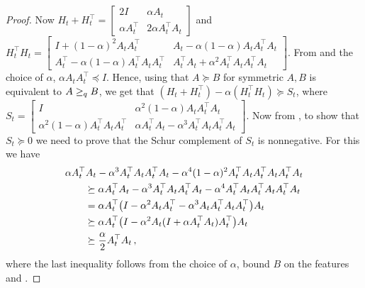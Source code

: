 \begin{proof}
Now 
$H_t+H_t^\top
	=\left[
		\begin{matrix} 2I & \alpha A_t\\ \alpha A_t^\top & 2\alpha A_t^\top A_t\end{matrix}\right]$ 
and $H_t^\top H_t=\left[\begin{matrix} I+(1-\alpha)^2A_tA_t^\top & A_t-\alpha(1-\alpha)A_tA_t^\top A_t\\ A_t^\top-\alpha(1-\alpha)A_t^\top A_t A_t^\top & A_t^\top A_t+\alpha^2A_t^\top A_t A_t^\top A_t\end{matrix}\right]$.  
From  and the choice of $\alpha$, $\alpha A_t A_t^\top \preceq I$. Hence, using that $A\succeq B$ for symmetric $A,B$ is equivalent to $A \geq_q B$, we get that
 $(H_t+H_t^\top) -\alpha(H_t^\top H_t) \succeq S_t$, 
 where $S_t=\left[\begin{matrix}I &\alpha^2(1-\alpha) A_tA_t^\top A_t\\ \alpha^2(1-\alpha) A_t^\top A_t A_t^\top &\alpha A_t^\top A_t-\alpha^3A_t^\top A_tA_t^\top A_t\end{matrix}\right]$. Now from , to show that $S_t\succeq 0$ we need to prove that the Schur complement of $S_t$ is nonnegative. For this we have
\begin{align*}
\MoveEqLeft 
\alpha A_t^\top A_t -\alpha^3A_t^\top A_t A_t^\top A_t - \alpha^4(1-\alpha)^2A_t^\top A_t A_t^\top A_t A_t^\top A_t\\
&\succeq
\alpha A_t^\top A_t -\alpha^3A_t^\top A_t A_t^\top A_t - \alpha^4 A_t^\top A_t A_t^\top A_t A_t^\top A_t\\
&=\alpha A_t^\top\big(I-\alpha^2 A_tA_t^\top-\alpha^3A_tA_t^\top A_tA_t^\top\big)A_t\\
&\succeq \alpha A_t^\top\big(I-\alpha^2 A_t(I+\alpha A_t^\top A_t)A_t^\top\big)A_t\\
&\succeq \frac{\alpha}{2} A_t^\top A_t\,,
\end{align*}
where the last inequality follows from the choice of $\alpha$, bound $B$ on the features and .
\end{proof}

